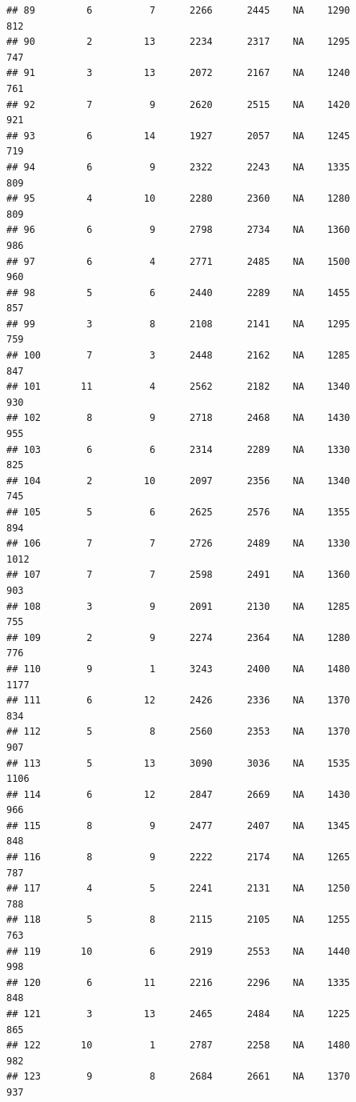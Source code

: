 \documentclass[]{book}
\begin{document}
\begin{verbatim}
## 89         6          7      2266      2445    NA    1290            812
## 90         2         13      2234      2317    NA    1295            747
## 91         3         13      2072      2167    NA    1240            761
## 92         7          9      2620      2515    NA    1420            921
## 93         6         14      1927      2057    NA    1245            719
## 94         6          9      2322      2243    NA    1335            809
## 95         4         10      2280      2360    NA    1280            809
## 96         6          9      2798      2734    NA    1360            986
## 97         6          4      2771      2485    NA    1500            960
## 98         5          6      2440      2289    NA    1455            857
## 99         3          8      2108      2141    NA    1295            759
## 100        7          3      2448      2162    NA    1285            847
## 101       11          4      2562      2182    NA    1340            930
## 102        8          9      2718      2468    NA    1430            955
## 103        6          6      2314      2289    NA    1330            825
## 104        2         10      2097      2356    NA    1340            745
## 105        5          6      2625      2576    NA    1355            894
## 106        7          7      2726      2489    NA    1330           1012
## 107        7          7      2598      2491    NA    1360            903
## 108        3          9      2091      2130    NA    1285            755
## 109        2          9      2274      2364    NA    1280            776
## 110        9          1      3243      2400    NA    1480           1177
## 111        6         12      2426      2336    NA    1370            834
## 112        5          8      2560      2353    NA    1370            907
## 113        5         13      3090      3036    NA    1535           1106
## 114        6         12      2847      2669    NA    1430            966
## 115        8          9      2477      2407    NA    1345            848
## 116        8          9      2222      2174    NA    1265            787
## 117        4          5      2241      2131    NA    1250            788
## 118        5          8      2115      2105    NA    1255            763
## 119       10          6      2919      2553    NA    1440            998
## 120        6         11      2216      2296    NA    1335            848
## 121        3         13      2465      2484    NA    1225            865
## 122       10          1      2787      2258    NA    1480            982
## 123        9          8      2684      2661    NA    1370            937

\end{verbatim}
\end{document}
